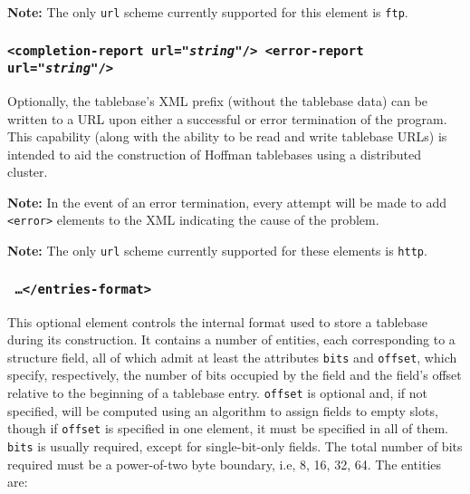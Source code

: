 \documentclass[11pt]{article}
\begin{document}
{\bf Note:} The only {\tt url} scheme currently supported for this
element is {\tt ftp}.

\subsubsection{\tt <completion-report url="{\it string}"/> \hfil\break <error-report url="{\it string}"/>}

Optionally, the tablebase's XML prefix (without the tablebase data) can
be written to a URL upon either a successful or error termination of
the program.  This capability (along with the ability to be read and
write tablebase URLs) is intended to aid the construction of Hoffman
tablebases using a distributed cluster.

{\bf Note:} In the event of an error termination, every attempt will
be made to add {\tt <error>} elements to the XML indicating the
cause of the problem.

{\bf Note:} The only {\tt url} scheme currently supported for these
elements is {\tt http}.

\subsubsection{\tt <entries-format> \ldots\quad </entries-format>}

This optional element controls the internal format used to store a
tablebase during its construction.  It contains a number of entities,
each corresponding to a structure field, all of which admit at least
the attributes {\tt bits} and {\tt offset}, which specify,
respectively, the number of bits occupied by the field and the field's
offset relative to the beginning of a tablebase entry.  {\tt offset}
is optional and, if not specified, will be computed using an algorithm
to assign fields to empty slots, though if {\tt offset} is specified
in one element, it must be specified in all of them. {\tt bits} is
usually required, except for single-bit-only fields.  The total number
of bits required must be a power-of-two byte boundary, i.e, 8, 16, 32,
64.  The entities are:
\end{document}
